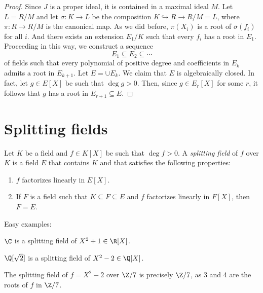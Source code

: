 \begin{proof}
    Since $J$ is a proper ideal, it is contained in a maximal ideal $M$. Let $L=R/M$ 
    and let $\sigma\colon K\to L$ be the composition $K\hookrightarrow R\to R/M=L$, 
    where $\pi\colon R\to R/M$ is the canonical map.  
    As we did before,
    $\pi(X_i)$ is a root of $\overline{\sigma}(f_i)$ for all $i$. And 
    there exists an extension $E_1/K$ such that
    every $f_i$ has a root in $E_1$. Proceeding in this way, we construct
    a sequence
    \[
    E_1\subseteq E_2\subseteq\cdots
    \]
    of fields such that every polynomial of positive degree and coefficients in $E_k$ 
    admits a root in $E_{k+1}$. Let $E=\cup E_k$. We claim that $E$ is algebraically closed. In fact, 
    let $g\in E[X]$ be such that $\deg g>0$. Then, since $g\in E_r[X]$ for some $r$, it follows
    that $g$ has a root in $E_{r+1}\subseteq E$. 
\end{proof}

\section{Splitting fields}


\begin{definition}
\label{def:splitting_field}
\label{def:decomposition_field}
	Let $K$ be a field and $f\in K[X]$ be such that $\deg f>0$. A \emph{splitting field} of $f$ over $K$ is a field $E$ that contains $K$ and that satisfies the following properties:
	\begin{enumerate}
		\item $f$ factorizes linearly in $E[X]$. 
		\item If $F$ is a field such that $K\subseteq F\subseteq E$ and 
			$f$ factorizes
			linearly in $F[X]$, then $F=E$. 
	\end{enumerate}
\end{definition}

Easy examples: 

\begin{example}
	$\C$ is a splitting field of $X^2+1\in\R[X]$. 
\end{example}

\begin{example}
	$\Q[\sqrt{2}]$ is a splitting field of $X^2-2\in\Q[X]$. 
\end{example}

\begin{example}
    The splitting field of $f=X^2-2$ over $\Z/7$ is 
    precisely $\Z/7$, as 3 and 4 are the roots of $f$ in $\Z/7$. 
\end{example}

